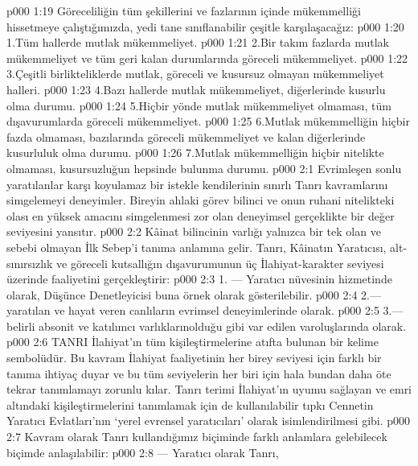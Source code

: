 \vs p000 1:19 Göreceliliğin tüm şekillerini ve fazlarının içinde mükemmelliği hissetmeye çalıştığımızda, yedi tane sınıflanabilir çeşitle karşılaşacağız:
\vs p000 1:20 1.\bibnobreakspace Tüm hallerde mutlak mükemmeliyet.
\vs p000 1:21 2.\bibnobreakspace Bir takım fazlarda mutlak mükemmeliyet ve tüm geri kalan durumlarında göreceli mükemmeliyet.
\vs p000 1:22 3.\bibnobreakspace Çeşitli birlikteliklerde mutlak, göreceli ve kusursuz olmayan mükemmeliyet halleri.
\vs p000 1:23 4.\bibnobreakspace Bazı hallerde mutlak mükemmeliyet, diğerlerinde kusurlu olma durumu.
\vs p000 1:24 5.\bibnobreakspace Hiçbir yönde mutlak mükemmeliyet olmaması, tüm dışavurumlarda göreceli mükemmeliyet.
\vs p000 1:25 6.\bibnobreakspace Mutlak mükemmelliğin hiçbir fazda olmaması, bazılarında göreceli mükemmeliyet ve kalan diğerlerinde kusurluluk olma durumu.
\vs p000 1:26 7.\bibnobreakspace Mutlak mükemmelliğin hiçbir nitelikte olmaması, kusursuzluğun hepsinde bulunma durumu.
\vs p000 2:1 Evrimleşen sonlu yaratılanlar karşı koyulamaz bir istekle kendilerinin sınırlı Tanrı kavramlarını simgelemeyi deneyimler. Bireyin ahlaki görev bilinci ve onun ruhani nitelikteki olası en yüksek amacını simgelenmesi zor olan deneyimsel gerçeklikte bir değer seviyesini yansıtır.
\vs p000 2:2 Kâinat bilincinin varlığı yalnızca bir tek olan ve sebebi olmayan İlk Sebep’i tanıma anlamına gelir. Tanrı, Kâinatın Yaratıcısı, alt\hyp{}sınırsızlık ve göreceli kutsallığın dışavurumunun üç İlahiyat\hyp{}karakter seviyesi üzerinde faaliyetini gerçekleştirir:
\vs p000 2:3 1.\bibnobreakspace {} --- Yaratıcı nüvesinin hizmetinde olarak, Düşünce Denetleyicisi buna örnek olarak gösterilebilir.
\vs p000 2:4 2.\bibnobreakspace {}--- yaratılan ve hayat veren canlıların evrimsel deneyimlerinde olarak.
\vs p000 2:5 3.\bibnobreakspace {}--- belirli absonit ve katılımcı varlıkların\bibemph{ }olduğu gibi var edilen varoluşlarında olarak.
\vs p000 2:6 TANRI İlahiyat’ın tüm kişileştirmelerine atıfta bulunan bir kelime sembolüdür. Bu kavram İlahiyat faaliyetinin her birey seviyesi için farklı bir tanıma ihtiyaç duyar ve bu tüm seviyelerin her biri için hala bundan daha öte tekrar tanımlamayı zorunlu kılar. Tanrı terimi İlahiyat’ın uyumu sağlayan ve emri altındaki kişileştirmelerini tanımlamak için de kullanılabilir tıpkı Cennetin Yaratıcı Evlatları’nın ‘yerel evrensel yaratıcıları’ olarak isimlendirilmesi gibi.
\vs p000 2:7 Kavram olarak Tanrı kullandığımız biçiminde farklı anlamlara gelebilecek biçimde anlaşılabilir:
\vs p000 2:8 --- Yaratıcı olarak Tanrı,
